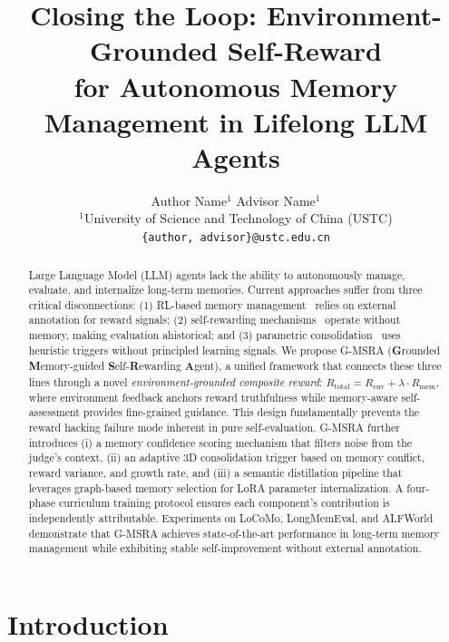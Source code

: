 \documentclass{article}
\title{Closing the Loop: Environment-Grounded Self-Reward \\ for Autonomous Memory Management in Lifelong LLM Agents}
\author{
  Author Name$^{1}$ \quad Advisor Name$^{1}$ \\
  $^{1}$University of Science and Technology of China (USTC) \\
  \texttt{\{author, advisor\}@ustc.edu.cn}
}
\newcommand{\gmsra}{\textsc{G-MSRA}}
\newcommand{\renv}{R_{\mathrm{env}}}
\newcommand{\rmem}{R_{\mathrm{mem}}}
\newcommand{\rtotal}{R_{\mathrm{total}}}
\begin{document}
\maketitle

\begin{abstract}

Large Language Model (LLM) agents lack the ability to autonomously manage, evaluate, and internalize long-term memories. Current approaches suffer from three critical disconnections: (1) RL-based memory management~\citep{chen2025memoryr1} relies on external annotation for reward signals; (2) self-rewarding mechanisms~\citep{yuan2024selfrewarding} operate without memory, making evaluation ahistorical; and (3) parametric consolidation~\citep{zhang2026selfconsolidation} uses heuristic triggers without principled learning signals. We propose \gmsra{} (\textbf{G}rounded \textbf{M}emory-guided \textbf{S}elf-\textbf{R}ewarding \textbf{A}gent), a unified framework that connects these three lines through a novel \emph{environment-grounded composite reward}: $\rtotal = \renv + \lambda \cdot \rmem$, where environment feedback anchors reward truthfulness while memory-aware self-assessment provides fine-grained guidance. This design fundamentally prevents the reward hacking failure mode inherent in pure self-evaluation. \gmsra{} further introduces (i) a memory confidence scoring mechanism that filters noise from the judge's context, (ii) an adaptive 3D consolidation trigger based on memory conflict, reward variance, and growth rate, and (iii) a semantic distillation pipeline that leverages graph-based memory selection for LoRA parameter internalization. A four-phase curriculum training protocol ensures each component's contribution is independently attributable. Experiments on LoCoMo, LongMemEval, and ALFWorld demonstrate that \gmsra{} achieves state-of-the-art performance in long-term memory management while exhibiting stable self-improvement without external annotation.

\end{abstract}

\section{Introduction}
\label{sec:intro}
\end{document}
